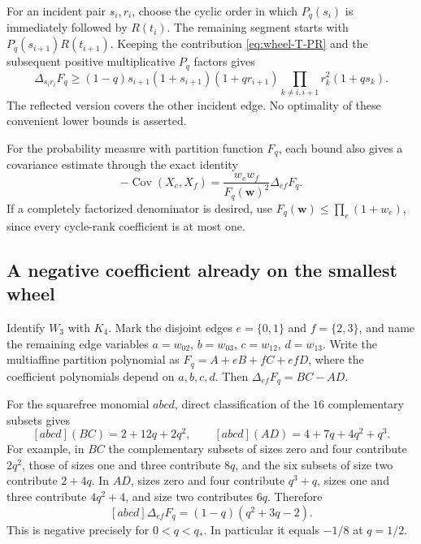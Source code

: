 \documentclass[11pt,a4paper]{article}
\theoremstyle{definition}
\theoremstyle{remark}\newtheorem{remark}[theorem]{Remark}
\begin{document}
For an incident pair $s_i,r_i$, choose the cyclic order in which
$P_q(s_i)$ is immediately followed by $R(t_i)$. The remaining segment
starts with $P_q(s_{i+1})R(t_{i+1})$.
Keeping the contribution \eqref{eq:wheel-T-PR} and the subsequent
positive multiplicative $P_q$ factors gives
\begin{equation}\label{eq:wheel-lower-incident}
 \Delta_{s_i r_i}F_q
 \ge (1-q)s_{i+1}(1+s_{i+1})(1+qr_{i+1})
 \prod_{k\ne i,i+1}r_k^2(1+qs_k).
\end{equation}
The reflected version covers the other incident edge.
No optimality of these convenient lower bounds is asserted.

For the probability measure with partition function $F_q$, each bound
also gives a covariance estimate through the exact identity
\[
 -\operatorname{Cov}(X_e,X_f)
 =\frac{w_ew_f}{F_q(\boldsymbol w)^2}\Delta_{ef}F_q.
\]
If a completely factorized denominator is desired, use
$F_q(\boldsymbol w)\le\prod_e(1+w_e)$, since every cycle-rank
coefficient is at most one.

\subsection{A negative coefficient already on the smallest wheel}

Identify $W_3$ with $K_4$. Mark the disjoint edges
$e=\{0,1\}$ and $f=\{2,3\}$, and name the remaining edge variables
$a=w_{02}$, $b=w_{03}$, $c=w_{12}$, $d=w_{13}$.
Write the multiaffine partition polynomial as
$F_q=A+eB+fC+efD$, where the coefficient polynomials depend on
$a,b,c,d$. Then $\Delta_{ef}F_q=BC-AD$.

For the squarefree monomial $abcd$, direct classification of the
$16$ complementary subsets gives
\[
 [abcd](BC)=2+12q+2q^2,\qquad
 [abcd](AD)=4+7q+4q^2+q^3.
\]
For example, in $BC$ the complementary subsets of sizes zero and four
contribute $2q^2$, those of sizes one and three contribute $8q$,
and the six subsets of size two contribute $2+4q$.
In $AD$, sizes zero and four contribute $q^3+q$, sizes one
and three contribute $4q^2+4$, and size two contributes $6q$.
Therefore
\begin{equation}\label{eq:wheel-negative-coefficient}
 [abcd]\Delta_{ef}F_q
 =(1-q)(q^2+3q-2).
\end{equation}
This is negative precisely for $0<q<q_*$. In particular it equals
$-1/8$ at $q=1/2$.
\end{document}
